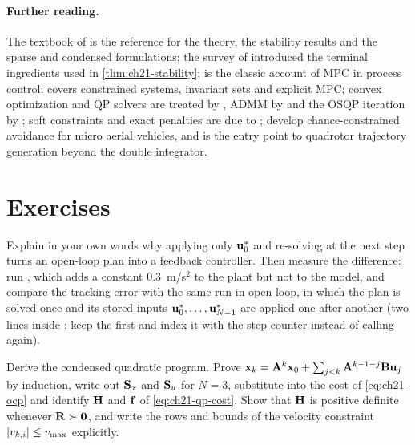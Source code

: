 \paragraph{Further reading.}
The textbook of \textcite{rawlings2017mpc} is the reference for the theory,
the stability results and the sparse and condensed formulations; the survey
of \textcite{mayne2000constrained} introduced the terminal ingredients used
in \cref{thm:ch21-stability}; \textcite{garcia1989model} is the classic
account of MPC in process control; \textcite{borrelli2017predictive} covers
constrained systems, invariant sets and explicit MPC; convex optimization and
QP solvers are treated by \textcite{boyd2004convex}, ADMM by
\textcite{boyd2011admm} and the OSQP iteration by \textcite{stellato2020osqp};
soft constraints and exact penalties are due to \textcite{kerrigan2000soft};
\textcite{zhu2019chance} develop chance-constrained avoidance for micro
aerial vehicles, and \textcite{mellinger2011minimum} is the entry point to
quadrotor trajectory generation beyond the double integrator.

\section{Exercises}
\label{sec:ch21-exercises}

\begin{exercise}[\difficulty{1}]
\label{exr:ch21-receding}
Explain in your own words why applying only $\mathbf{u}_0^{*}$ and re-solving at
the next step turns an open-loop plan into a feedback controller. Then measure
the difference: run , which adds a
constant $0.3$~m/s$^2$ to the plant but not to the model, and compare the
tracking error with the same run in open loop, in which the plan is solved
once and its stored inputs $\mathbf{u}_0^{*},\dots,\mathbf{u}_{N-1}^{*}$ are applied one
after another (two lines inside : keep the first 
and index it with the step counter instead of calling  again).
\end{exercise}

\begin{exercise}[\difficulty{2}]
\label{exr:ch21-condensed}
Derive the condensed quadratic program. Prove
$\mathbf{x}_k=\mathbf{A}^{k}\mathbf{x}_0+\sum_{j<k}\mathbf{A}^{k-1-j}\mathbf{B}\mathbf{u}_j$ by induction,
write out $\mathbf{S}_x$ and $\mathbf{S}_u$ for $N=3$, substitute into the cost of
\cref{eq:ch21-ocp} and identify $\mathbf{H}$ and $\mathbf{f}$ of
\cref{eq:ch21-qp-cost}. Show that $\mathbf{H}$ is positive definite whenever
$\mathbf{R}\succ\mathbf{0}$, and write the rows and bounds of the velocity
constraint $\left\lvert v_{k,i} \right\rvert\le v_{\max}$ explicitly.
\end{exercise}


